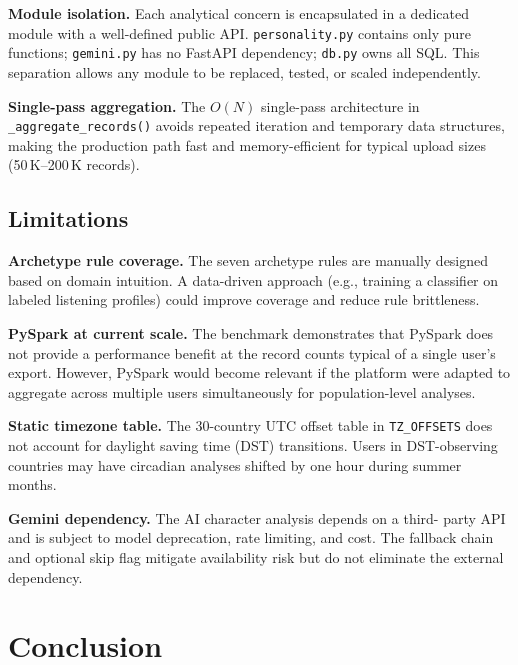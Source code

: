 \documentclass[conference]{IEEEtran}
\begin{document}
\textbf{Module isolation.} Each analytical concern is encapsulated in a
dedicated module with a well-defined public API. \texttt{personality.py}
contains only pure functions; \texttt{gemini.py} has no FastAPI dependency;
\texttt{db.py} owns all SQL. This separation allows any module to be
replaced, tested, or scaled independently.

\textbf{Single-pass aggregation.} The $O(N)$ single-pass architecture in
\texttt{\_aggregate\_records()} avoids repeated iteration and
temporary data structures, making the production path fast and
memory-efficient for typical upload sizes (50\,K–200\,K records).

\subsection{Limitations}

\textbf{Archetype rule coverage.} The seven archetype rules are manually
designed based on domain intuition. A data-driven approach
(e.g., training a classifier on labeled listening profiles) could
improve coverage and reduce rule brittleness.

\textbf{PySpark at current scale.} The benchmark demonstrates that PySpark
does not provide a performance benefit at the record counts typical of a
single user's export. However, PySpark would become relevant if the
platform were adapted to aggregate across multiple users simultaneously
for population-level analyses.

\textbf{Static timezone table.} The 30-country UTC offset table in
\texttt{TZ\_OFFSETS} does not account for daylight saving time (DST)
transitions. Users in DST-observing countries may have circadian analyses
shifted by one hour during summer months.

\textbf{Gemini dependency.} The AI character analysis depends on a third-
party API and is subject to model deprecation, rate limiting, and cost.
The fallback chain and optional skip flag mitigate availability risk but
do not eliminate the external dependency.

\section{Conclusion}
\end{document}

